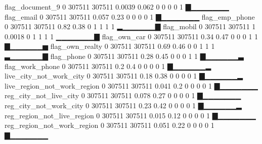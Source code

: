 \documentclass[a4paper]{article}
\begin{document}
\begin{Schunk}
\begin{Soutput}
             flag_document_9       0   307511 307511     0.0039  0.062   0   0   0   0    1 ▇▁▁▁▁▁▁▁
                  flag_email       0   307511 307511     0.057   0.23    0   0   0   0    1 ▇▁▁▁▁▁▁▁
              flag_emp_phone       0   307511 307511     0.82    0.38    0   1   1   1    1 ▂▁▁▁▁▁▁▇
                  flag_mobil       0   307511 307511     1       0.0018  0   1   1   1    1 ▁▁▁▁▁▁▁▇
                flag_own_car       0   307511 307511     0.34    0.47    0   0   0   1    1 ▇▁▁▁▁▁▁▅
             flag_own_realty       0   307511 307511     0.69    0.46    0   0   1   1    1 ▃▁▁▁▁▁▁▇
                  flag_phone       0   307511 307511     0.28    0.45    0   0   0   1    1 ▇▁▁▁▁▁▁▃
             flag_work_phone       0   307511 307511     0.2     0.4     0   0   0   0    1 ▇▁▁▁▁▁▁▂
     live_city_not_work_city       0   307511 307511     0.18    0.38    0   0   0   0    1 ▇▁▁▁▁▁▁▂
 live_region_not_work_region       0   307511 307511     0.041   0.2     0   0   0   0    1 ▇▁▁▁▁▁▁▁
      reg_city_not_live_city       0   307511 307511     0.078   0.27    0   0   0   0    1 ▇▁▁▁▁▁▁▁
      reg_city_not_work_city       0   307511 307511     0.23    0.42    0   0   0   0    1 ▇▁▁▁▁▁▁▂
  reg_region_not_live_region       0   307511 307511     0.015   0.12    0   0   0   0    1 ▇▁▁▁▁▁▁▁
  reg_region_not_work_region       0   307511 307511     0.051   0.22    0   0   0   0    1 ▇▁▁▁▁▁▁▁
\end{Soutput}
\end{Schunk}
\end{document}
